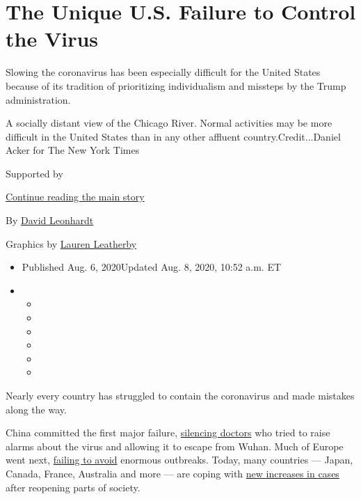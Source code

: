 \hypertarget{the-unique-us-failure-to-control-the-virus}{%
\section{The Unique U.S. Failure to Control the
Virus}\label{the-unique-us-failure-to-control-the-virus}}

Slowing the coronavirus has been especially difficult for the United
States because of its tradition of prioritizing individualism and
missteps by the Trump administration.

A socially distant view of the Chicago River. Normal activities may be
more difficult in the United States than in any other affluent
country.Credit...Daniel Acker for The New York Times

Supported by

\protect\hyperlink{after-sponsor}{Continue reading the main story}

By \href{https://www.nytimes.com/by/david-leonhardt}{David Leonhardt}

Graphics by \href{https://www.nytimes.com/by/lauren-leatherby}{Lauren
Leatherby}

\begin{itemize}
\item
  Published Aug. 6, 2020Updated Aug. 8, 2020, 10:52 a.m. ET
\item
  \begin{itemize}
  \item
  \item
  \item
  \item
  \item
  \item
  \end{itemize}
\end{itemize}

Nearly every country has struggled to contain the coronavirus and made
mistakes along the way.

China committed the first major failure,
\href{https://www.nytimes.com/2020/02/01/world/asia/china-coronavirus.html}{silencing
doctors} who tried to raise alarms about the virus and allowing it to
escape from Wuhan. Much of Europe went next,
\href{https://www.nytimes.com/2020/03/21/world/europe/italy-coronavirus-center-lessons.html}{failing
to avoid} enormous outbreaks. Today, many countries --- Japan, Canada,
France, Australia and more --- are coping with
\href{https://www.nytimes.com/interactive/2020/world/coronavirus-maps.html}{new
increases in cases} after reopening parts of society.

